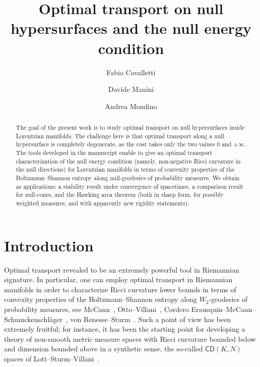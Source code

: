 \documentclass[12pt,a4paper]{amsart}
\title[Optimal transport on null hypersurfaces and the NEC]{Optimal transport on null hypersurfaces and the null energy condition}
\author{Fabio Cavalletti}
\author{Davide Manini}
\author{Andrea Mondino}
\theoremstyle{plain}
\theoremstyle{definition}
\numberwithin{equation}{section}
\begin{document}
\begin{abstract}
The goal of the present work is to study optimal transport on null hypersurfaces inside Lorentzian manifolds. The challenge here is that optimal transport along a null hypersurface is completely degenerate, as the cost takes only the two values $0$ and $+\infty$.
The tools developed in the manuscript enable to give an optimal transport characterization of the null energy condition (namely, non-negative Ricci curvature in the null directions) for Lorentzian manifolds in terms of convexity properties of the Boltzmann--Shannon entropy along null-geodesics of probability measures.
 We obtain as applications: a stability result under convergence of spacetimes, a comparison result for null-cones, and the Hawking area theorem (both in sharp form, for possibly weighted measures, and with apparently new rigidity statements).
\end{abstract}




\maketitle
\setcounter{tocdepth}{1}





\tableofcontents

\section{Introduction}
Optimal transport revealed to be an extremely powerful tool in Riemannian signature.  In particular, one can employ optimal transport in Riemannian manifolds in order to characterize Ricci curvature lower bounds in terms of convexity properties of the Boltzmann--Shannon entropy along $W_2$-geodesics of probability measures,   see McCann~\cite{McCannThesis}, Otto--Villani~\cite{OttoVillani}, Cordero Erausquin--McCann--Schmuckenschl\"ager~\cite{CEMS}, von Renesse--Sturm~\cite{vRS}. Such a point of view has been extremely fruitful; for instance, it has been the starting point for developing a theory of non-smooth metric measure spaces with Ricci curvature bounded below and dimension bounded above in a synthetic sense, the so-called ${\mathsf{CD}}(K,N)$ spaces of Lott--Sturm--Villani~\cite{sturm:I, sturm:II, lottvillani}.
\end{document}
